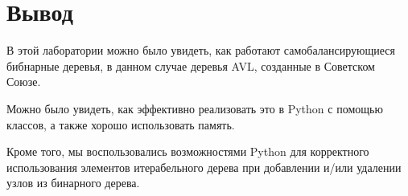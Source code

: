 
\section{Вывод}

В этой лаборатории можно было увидеть, как работают самобалансирующиеся
бибнарные деревья, в данном случае деревья AVL, созданные в Советском Союзе.

Можно было увидеть, как эффективно реализовать это в Python с помощью классов,
а также хорошо использовать память.

Кроме того, мы воспользовались возможностями Python для корректного
использования элементов итерабельного дерева при добавлении и/или удалении
узлов из бинарного дерева.
